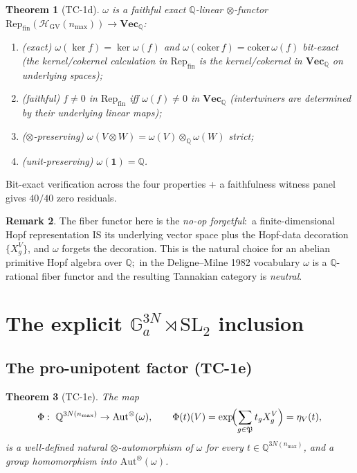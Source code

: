 \documentclass[11pt,a4paper]{article}
\theoremstyle{plain}
\newtheorem{theorem}{Theorem}[section]
\theoremstyle{definition}
\newtheorem{remark}[theorem]{Remark}
\newcommand{\nmax}{n_{\max}}
\newcommand{\HGV}{\mathcal{H}_{\mathrm{GV}}}
\newcommand{\Repcat}{\mathrm{Rep}_{\mathrm{fin}}}
\newcommand{\Aut}{\mathrm{Aut}}
\newcommand{\SL}{\mathrm{SL}}
\newcommand{\Ga}{\mathbb{G}_{a}}
\newcommand{\Vecbf}{\mathbf{Vec}}
\newcommand{\Q}{\mathbb{Q}}
\newcommand{\Phimap}{\Phi}
\newcommand{\fibfun}{\omega}
\begin{document}
\begin{theorem}[TC-1d]\label{thm:fiber_functor}
$\fibfun$ is a faithful exact $\Q$-linear $\otimes$-functor
$\Repcat(\HGV(\nmax)) \to \Vecbf_{\Q}$:\
\begin{enumerate}
\item (exact) $\fibfun(\ker f) = \ker \fibfun(f)$ and
  $\fibfun(\mathrm{coker}\, f) = \mathrm{coker}\, \fibfun(f)$ bit-exact
  (the kernel/cokernel calculation in $\Repcat$ is the kernel/cokernel
  in $\Vecbf_{\Q}$ on underlying spaces);
\item (faithful) $f \ne 0$ in $\Repcat$ iff $\fibfun(f) \ne 0$ in
  $\Vecbf_{\Q}$ (intertwiners are determined by their underlying linear
  maps);
\item ($\otimes$-preserving) $\fibfun(V \otimes W) = \fibfun(V)
  \otimes_{\Q} \fibfun(W)$ strict;
\item (unit-preserving) $\fibfun(\mathbf{1}) = \Q$.
\end{enumerate}
\end{theorem}

Bit-exact verification across the four properties + a faithfulness
witness panel gives $40 / 40$ zero residuals.

\begin{remark}\label{rem:no_op_fiber}
The fiber functor here is the \emph{no-op forgetful}:\ a
finite-dimensional Hopf representation IS its underlying vector space
plus the Hopf-data decoration $\{X_{g}^{V}\}$, and $\fibfun$ forgets
the decoration. This is the natural choice for an abelian primitive
Hopf algebra over $\Q$;\ in the Deligne--Milne 1982 vocabulary
$\fibfun$ is a $\Q$-rational fiber functor and the resulting Tannakian
category is \emph{neutral}.
\end{remark}

\section{The explicit $\Ga^{3N} \rtimes \SL_{2}$ inclusion}
\label{sec:ustar_inclusion}

\subsection{The pro-unipotent factor (TC-1e)}\label{sec:ga_explicit}

\begin{theorem}[TC-1e]\label{thm:ga_inclusion}
The map
\[
   \Phimap :\ \Q^{3 N(\nmax)} \to \Aut^{\otimes}(\fibfun),
   \qquad
   \Phimap(t)(V) = \exp\!\Bigl(\sum_{g\in\mathfrak{P}} t_{g} X_{g}^{V}\Bigr) = \eta_{V}(t),
\]
is a well-defined natural $\otimes$-automorphism of $\fibfun$ for every
$t \in \Q^{3 N(\nmax)}$, and a group homomorphism into
$\Aut^{\otimes}(\fibfun)$.
\end{theorem}
\end{document}
